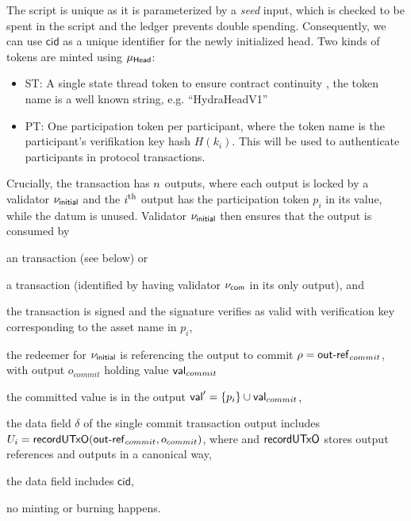 The script is unique as it is parameterized by a \emph{seed} input, which is
checked to be spent in the script  and the ledger
prevents double spending. Consequently, we can use $\mathsf{cid}$ as a unique
identifier for the newly initialized head. Two kinds of tokens are minted using
$\mu_\mathsf{Head}$:
\begin{itemize}
\item ST: A single state thread token to ensure contract continuity , the token name is a well known string, e.g. “HydraHeadV1”
\item PT: One participation token per participant, where the token name is the participant's verifikation key hash $H(k_i)$. This will be used to authenticate participants in protocol transactions.
\end{itemize}


Crucially, the \mtxInit{} transaction has $n$ outputs, where each output is
locked by a validator $\nu_\mathsf{initial}$ and the $i^{\text{th}}$ output has the participation
token $p_i$ in its value, while the datum is unused. Validator $\nu_\mathsf{initial}$
then ensures that the output is consumed by

\begin{menumerate}
  \item an \mtxAbort{} transaction (see below) or
  \item a \mtxCom{} transaction (identified by having validator $\nu_\mathsf{com}$ in its
  only output), and
  \begin{menumerate}
    \item the transaction is signed and the signature verifies as valid with
    verification key corresponding to the asset name in $p_i$,
    \item the redeemer for $\nu_\mathsf{initial}$ is referencing the output to commit $ \rho = \mathsf{out\textsf{-}{}ref}_{commit}$, with output $o_{commit}$ holding value $\mathsf{val}_{commit}$
    \item the committed value is in the output $\mathsf{val}' = \{p_{i}\} \cup \mathsf{val}_{commit} $,
    \item the data field $\delta$ of the single commit transaction output includes \\
    $U_i = \mathsf{recordUTxO}(\mathsf{out\textsf{-}{}ref}_{commit},o_{commit})$, where and $\mathsf{recordUTxO}$
    stores output references and outputs in a canonical way, 
    \item the data field includes $\mathsf{cid}$, 
    \item no minting or burning happens.
  \end{menumerate}
\end{menumerate}

